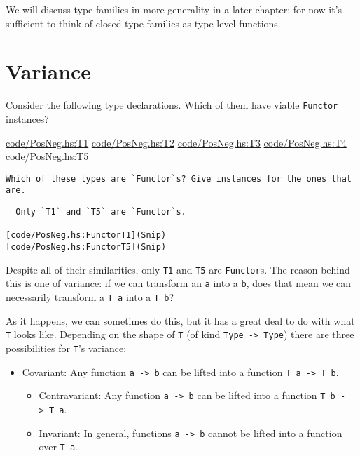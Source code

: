 \documentclass[
  11pt,
]{book}
\providecommand{\tightlist}{%
  \setlength{\itemsep}{0pt}\setlength{\parskip}{0pt}}
\theoremstyle{nonumberplain}
\begin{document}
We will discuss type families in more generality in a later chapter; for
now it's sufficient to think of closed type families as type-level
functions.

\hypertarget{variance}{%
\chapter{Variance}\label{variance}}

Consider the following type declarations. Which of them have viable
\texttt{Functor} instances?

\href{Snip}{code/PosNeg.hs:T1} \href{Snip}{code/PosNeg.hs:T2}
\href{Snip}{code/PosNeg.hs:T3} \href{Snip}{code/PosNeg.hs:T4}
\href{Snip}{code/PosNeg.hs:T5}

\begin{verbatim}
Which of these types are `Functor`s? Give instances for the ones that are.
\end{verbatim}

\begin{verbatim}
  Only `T1` and `T5` are `Functor`s.

[code/PosNeg.hs:FunctorT1](Snip)
[code/PosNeg.hs:FunctorT5](Snip)
\end{verbatim}

Despite all of their similarities, only \texttt{T1} and \texttt{T5} are
\texttt{Functor}s. The reason behind this is one of variance: if we can
transform an \texttt{a} into a \texttt{b}, does that mean we can
necessarily transform a \texttt{T\ a} into a \texttt{T\ b}?

As it happens, we can sometimes do this, but it has a great deal to do
with what \texttt{T} looks like. Depending on the shape of \texttt{T}
(of kind \texttt{Type\ -\textgreater{}\ Type}) there are three
possibilities for \texttt{T}'s variance:

\begin{itemize}
\tightlist
\item
  Covariant: Any function \texttt{a\ -\textgreater{}\ b} can be lifted
  into a function \texttt{T\ a\ -\textgreater{}\ T\ b}.

  \begin{itemize}
  \tightlist
  \item
    Contravariant: Any function \texttt{a\ -\textgreater{}\ b} can be
    lifted into a function \texttt{T\ b\ -\textgreater{}\ T\ a}.
  \item
    Invariant: In general, functions \texttt{a\ -\textgreater{}\ b}
    cannot be lifted into a function over \texttt{T\ a}.
  \end{itemize}
\end{itemize}
\end{document}
